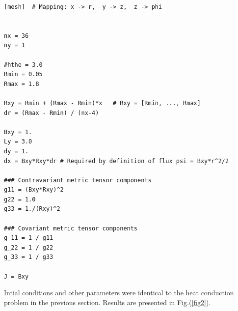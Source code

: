\documentclass[11pt, oneside]{article}
\begin{document}
\begin{lstlisting}
[mesh]  # Mapping: x -> r,  y -> z,  z -> phi


nx = 36
ny = 1

#hthe = 3.0
Rmin = 0.05
Rmax = 1.8

Rxy = Rmin + (Rmax - Rmin)*x   # Rxy = [Rmin, ..., Rmax]
dr = (Rmax - Rmin) / (nx-4)

Bxy = 1.
Ly = 3.0
dy = 1.
dx = Bxy*Rxy*dr # Required by definition of flux psi = Bxy*r^2/2

### Contravariant metric tensor components
g11 = (Bxy*Rxy)^2
g22 = 1.0
g33 = 1./(Rxy)^2

### Covariant metric tensor components
g_11 = 1 / g11
g_22 = 1 / g22
g_33 = 1 / g33

J = Bxy
\end{lstlisting}
Intial conditions and other parameters were identical to the heat conduction problem in the previous section. Results are presented in Fig.(\ref{fig2}).
\end{document}
